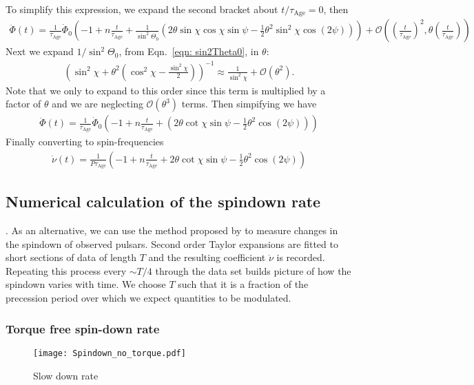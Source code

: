 \documentclass[../full_thesis/full_thesis.tex]{subfiles}
\newcommand{\tauAge}{\tau_{\mathrm{Age}}}
\begin{document}
To simplify this expression, we expand the second bracket about $t/\tauAge=0$, then
\begin{align}
\ddot{\Phi}(t) = \frac{1}{\tauAge} \dot{\Phi}_0
\left(-1 + n\frac{t}{\tauAge} +
\frac{1}{\sin^{2}\Theta_0}\left(
2\theta \sin\chi\cos\chi \sin\psi
- \frac{1}{2}\theta^{2}\sin^{2}\chi\cos(2\psi)
\right)\right)
+ \mathcal{O}\left(\left(\frac{t}{\tauAge}\right)^{2}, \theta\left(\frac{t}{\tauAge}\right)\right)
\end{align}
Next we expand $1/\sin^{2}\Theta_0$, from Eqn.~\eqref{eqn: sin2Theta0}, in $\theta$:
\begin{align}
\left(\sin^{2}\chi + \theta^{2}\left(\cos^{2}\chi - \frac{\sin^{2}\chi}{2}\right)\right)^{-1}
\approx
\frac{1}{\sin^{2}\chi} + \mathcal{O}(\theta^{2}).
\end{align}
Note that we only to expand to this order since this term is multiplied by a
factor of $\theta$ and we are neglecting $\mathcal{O}(\theta^{3})$ terms.
Then simpifying we have
\begin{align}
\ddot{\Phi}(t) = \frac{1}{\tauAge} \dot{\Phi}_0
\left(-1 + n \frac{t}{\tauAge} +
\left( 2\theta \cot\chi \sin\psi
- \frac{1}{2}\theta^{2}\cos(2\psi)
\right)\right)
\end{align}
Finally converting to spin-frequencies
\begin{align}
\dot{\nu}(t) = \frac{1}{P\tauAge}
\left(-1 + n \frac{t}{\tauAge} +
2\theta \cot\chi \sin\psi
- \frac{1}{2}\theta^{2}\cos(2\psi)
\right)
\end{align}

\subsection{Numerical calculation of the spindown rate}
. As an alternative, we
can use the method proposed by \citet{Lyne2010} to measure changes in the
spindown of observed pulsars. Second order Taylor expansions are fitted to
short sections of data of length $T$ and the resulting coefficient $\dot{\nu}$
is recorded. Repeating this process every $\sim T/4$ through the data set
builds picture of how the spindown varies with time. We choose $T$ such that it
is a fraction of the precession period over which we expect quantities to be
modulated.

\subsubsection{Torque free spin-down rate}
\begin{figure}[ht]
\centering
	\texttt{[image: Spindown\_no\_torque.pdf]}
\caption{Slow down rate }
\label{fig: nu_dot no torque}
\end{figure}
\end{document}
